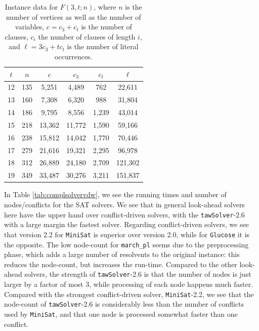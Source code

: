 \documentclass[final,3p,times]{elsarticle}
\theoremstyle{definition}
\newcommand{\tawsolver}{\texttt{tawSolver}}
\newcommand{\ntawsolver}{\tawsolver-2.6}
\newcommand{\march}{\texttt{march\_pl}}
\newcommand{\minisat}{\texttt{MiniSat}}
\newcommand{\glucose}{\texttt{Glucose}}
\begin{document}
\begin{table}[H]
  \centering
  \begin{tabular}{c|c||c|c|c|c}
    $t$ & $n$ & $c$ & $c_3$ & $c_t$ & $\ell$\\
    \hline
    12 & 135 & 5,251 & 4,489 & 762 & 22,611\\
    13 & 160 & 7,308 & 6,320 & 988 & 31,804\\
    14 & 186 & 9,795 & 8,556 & 1,239 & 43,014\\
    15 & 218 & 13,362 & 11,772 & 1,590 & 59,166\\
    16 & 238 & 15,812 & 14,042 & 1,770 & 70,446\\
    17 & 279 & 21,616 & 19,321 & 2,295 & 96,978\\
    18 & 312 & 26,889 & 24,180 & 2,709 & 121,302\\
    19 & 349 & 33,487 & 30,276 & 3,211 & 151,837
  \end{tabular}
  \caption{Instance data for $F(3,t;n)$, where $n$ is the number of vertices as well as the number of variables, $c=c_3+c_t$ is the number of clauses, $c_i$ the number of clauses of length $i$, and $\ell = 3 c_3 + t c_t$ is the number of literal occurrences.}
  \label{tab:vdwdata}
\end{table}

In Table \ref{tab:complsolvervdw}, we see the running times and number of nodes/conflicts for the SAT solvers. We see that in general look-ahead solvers here have the upper hand over conflict-driven solvers, with the \ntawsolver{} with a large margin the fastest solver. Regarding conflict-driven solvers, we see that version 2.2 for \minisat{} is superior over version 2.0, while for \glucose{} it is the opposite. The low node-count for \march{} seems due to the preprocessing phase, which adds a large number of resolvents to the original instance: this reduces the node-count, but increases the run-time. Compared to the other look-ahead solvers, the strength of \ntawsolver{} is that the number of nodes is just larger by a factor of most $3$, while processing of each node happens much faster. Compared with the strongest conflict-driven solver, \minisat-2.2, we see that the node-count of \ntawsolver{} is considerably less than the number of conflicts used by \minisat, and that one node is processed somewhat faster than one conflict.
\end{document}
